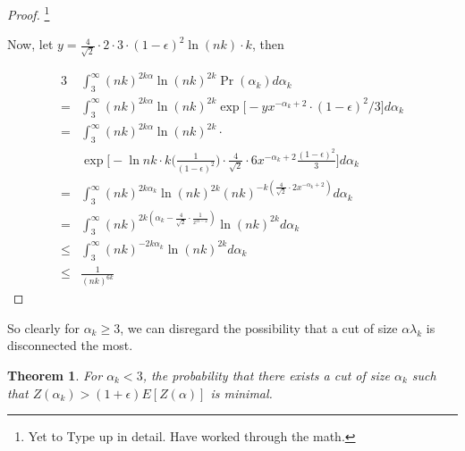 \documentclass{acm_proc_article-sp}
\newtheorem{theorem}{Theorem}
\begin{document}
\begin{proof}
\footnote{Yet to Type up in detail. Have worked through the math.}

Now, let $y = \frac{4}{\sqrt{2}} \cdot 2 \cdot 3 \cdot (1-\epsilon)^2 \ln{(nk)} \cdot k$, then

\begin{alignat*}{3}
&\int_{3}^\infty (nk)^{2k \alpha} \ln{(nk)^{2k}} \Pr(\alpha_k) d\alpha_k \\
= &\int_{3}^\infty (nk)^{2k \alpha} \ln{(nk)^{2k}} \exp \bigg[-y x^{-\alpha_k + 2} \cdot (1-\epsilon)^2/3 \bigg] d\alpha_k \\
= &\int_{3}^\infty (nk)^{2k \alpha} \ln{(nk)^{2k}} \cdot \\ &\exp \bigg[-\ln{nk} \cdot k \bigg(\frac{1}{(1-\epsilon)^2}\bigg) \cdot \frac{4}{\sqrt{2}} \cdot 6x^{-\alpha_k + 2} \frac{(1-\epsilon)^2}{3} \bigg] d\alpha_k \\
= &\int_{3}^\infty (nk)^{2k \alpha_k} \ln{(nk)^{2k}} (nk)^{-k(\frac{4}{\sqrt{2}} \cdot 2x^{-\alpha_k + 2})} d\alpha_k \\
= &\int_{3}^\infty (nk)^{2 k(\alpha_k - \frac{4}{\sqrt{2}} \cdot \frac{1}{x^{\alpha-2}})} \ln{(nk)}^{2k}  d\alpha_k \\
\leq &\int_{3}^\infty (nk)^{-2k \alpha_k} \ln{(nk)^{2k}} d\alpha_k \\
\leq &\frac{1}{(nk)^{6k}} 
\end{alignat*}
\end{proof}

So clearly for $\alpha_k \geq 3$, we can disregard the possibility that a cut of size $\alpha \lambda_k$ is disconnected the most.

\begin{theorem}
For $\alpha_k < 3$, the probability that there exists a cut of size $\alpha_k$  such that $Z(\alpha_k) > (1+\epsilon) E[Z(\alpha)]$ is minimal. 
\end{theorem}
\end{document}

